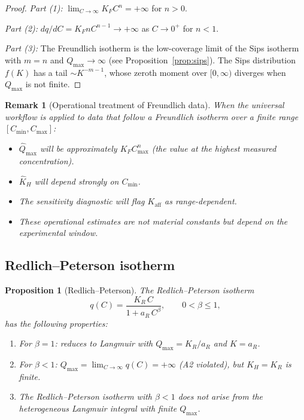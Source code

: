 \documentclass[12pt]{article}
\newtheorem{proposition}{Proposition}
\newtheorem{remark}{Remark}
\begin{document}
\begin{proof}
\textit{Part (1):} $\lim_{C\to\infty}K_F C^n=+\infty$ for $n>0$.

\textit{Part (2):}
$dq/dC=K_F n C^{n-1}\to+\infty$ as $C\to 0^+$ for $n<1$.

\textit{Part (3):}
The Freundlich isotherm is the low-coverage limit of the Sips
isotherm with $m=n$ and $Q_{\max}\to\infty$ (see
Proposition~\ref{prop:sips}).
The Sips distribution $f(K)$ has a tail $\sim K^{-m-1}$,
whose zeroth moment over $[0,\infty)$ diverges when $Q_{\max}$ is
not finite.
\end{proof}

\begin{remark}[Operational treatment of Freundlich data]
When the universal workflow is applied to data that follow a
Freundlich isotherm over a finite range $[C_{\min},C_{\max}]$:
\begin{itemize}[nosep]
  \item $\widehat{Q}_{\max}$ will be approximately $K_F C_{\max}^n$
        (the value at the highest measured concentration).
  \item $\widehat{K}_H$ will depend strongly on $C_{\min}$.
  \item The sensitivity diagnostic will flag
        $K_{\mathrm{aff}}$ as range-dependent.
  \item These operational estimates are \emph{not} material constants
        but depend on the experimental window.
\end{itemize}
\end{remark}

\subsection{Redlich--Peterson isotherm}

\begin{proposition}[Redlich--Peterson]
\label{prop:rp}
The Redlich--Peterson isotherm~\cite{Redlich1959}
\begin{equation}
  q(C) = \frac{K_R\,C}{1+a_R\,C^{\beta}},
  \qquad 0<\beta\le 1,
  \label{eq:rp}
\end{equation}
has the following properties:
\begin{enumerate}[nosep]
  \item For $\beta=1$: reduces to Langmuir with
        $Q_{\max}=K_R/a_R$ and $K=a_R$.
  \item For $\beta<1$:
        $Q_{\max}=\lim_{C\to\infty}q(C)=+\infty$ (A2 violated),
        but $K_H=K_R$ is finite.
  \item The Redlich--Peterson isotherm with $\beta<1$ does not arise
        from the heterogeneous Langmuir integral with finite
        $Q_{\max}$.
\end{enumerate}
\end{proposition}
\end{document}
